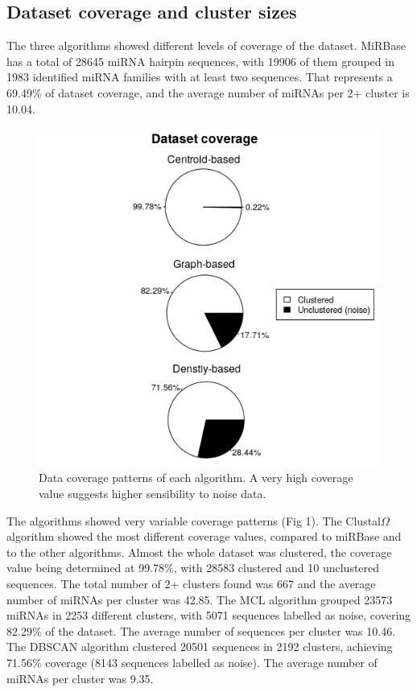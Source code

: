 \documentclass[nocrop]{bioinfo}
\begin{document}
\subsection{Dataset coverage and cluster sizes}
The three algorithms showed different levels of coverage of the dataset. MiRBase has a total of 28645 miRNA hairpin sequences, with 19906 of them grouped in 1983 identified miRNA families with at least two sequences. That represents a 69.49\% of dataset coverage, and the average number of miRNAs per 2+ cluster is 10.04.
\begin{figure}[ht]
\includegraphics[scale=0.45]{img/coverage.png}
\caption{Data coverage patterns of each algorithm. A very high coverage value suggests higher sensibility to noise data.}\label{fig:01}
\end{figure}
The algorithms showed very variable coverage patterns (Fig 1). The Clustal$\Omega$ algorithm showed the most different coverage values, compared to miRBase and to the other algorithms. Almost the whole dataset was clustered, the coverage value being determined at 99.78\%, with 28583 clustered and 10 unclustered sequences. The total number of 2+ clusters found was 667 and the average number of miRNAs per cluster was 42.85. The MCL algorithm grouped 23573 miRNAs in 2253 different clusters, with 5071 sequences labelled as noise, covering 82.29\% of the dataset. The average number of sequences per cluster was 10.46. The DBSCAN algorithm clustered 20501 sequences in 2192 clusters, achieving 71.56\% coverage (8143 sequences labelled as noise). The average number of miRNAs per cluster was 9.35.
\end{document}

